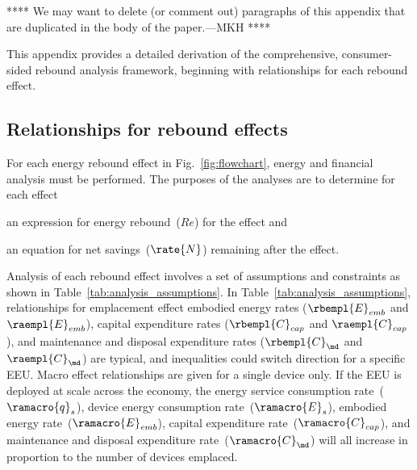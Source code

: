 

**** 
We may want to delete (or comment out)
paragraphs of this appendix that are duplicated
in the body of the paper.---MKH
****

This appendix provides a detailed derivation of 
the comprehensive, consumer-sided rebound analysis framework,
beginning with relationships for each rebound effect.


\subsection{Relationships for rebound effects}
\label{sec:relationships_for_stages}

For each energy rebound effect in Fig.~\ref{fig:flowchart},
energy and financial analysis must be performed.
The purposes of the analyses are to determine for each effect
%
\begin{enumerate*}[label={(\roman*)}]

  \item an expression for energy rebound~($Re$) for the effect and

  \item an equation for net savings~($\rate{N}$) remaining after the effect.

\end{enumerate*}

Analysis of each rebound effect
involves a set of assumptions and constraints
as shown in Table~\ref{tab:analysis_assumptions}.
In Table~\ref{tab:analysis_assumptions}, 
relationships for emplacement effect 
embodied energy rates ($\rbempl{E}_{emb}$ and $\raempl{E}_{emb}$), 
capital expenditure rates ($\rbempl{C}_{cap}$ and $\raempl{C}_{cap}$), and 
maintenance and disposal expenditure rates ($\rbempl{C}_{\md}$ and $\raempl{C}_{\md}$)
are typical, and
inequalities could switch direction for a specific EEU.
Macro effect relationships are given for a single device only.
If the EEU is deployed at scale across the economy, 
the energy service consumption rate~($\ramacro{q}_s$), 
device energy consumption rate~($\ramacro{E}_s$), 
embodied energy rate~($\ramacro{E}_{emb}$),
capital expenditure rate~($\ramacro{C}_{cap}$), and 
maintenance and disposal expenditure rate~($\ramacro{C}_{\md}$)
will all increase in proportion to the number of devices emplaced.

